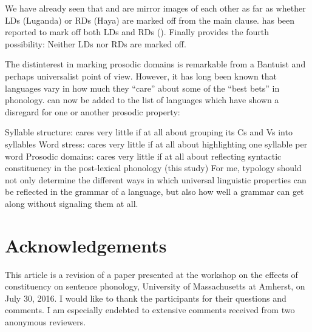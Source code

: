 \documentclass[output=paper]{langsci/langscibook}
\begin{document}
We have already seen that  and  are mirror images of each other as
far as whether \glspl{LD} (Luganda) or \glspl{RD} (Haya) are marked off from
the main clause.   has been reported to mark off both \glspl{LD} and
RDs (\citealt[1966--1967]{DowningMtenje2011}). Finally  provides the fourth
possibility: Neither \glspl{LD} nor \glspl{RD} are marked off.

The  distinterest in marking prosodic domains is
remarkable from a Bantuist and perhaps universalist point of view. However, it
has long been known that languages vary in how much they “care” about some of
the “best bets” in phonology.  can now be added to the list of languages
which have shown a disregard for one or another prosodic property:

\ea\label{ex:13.47}
    \ea Syllable structure:  cares very little if at all about grouping its Cs and Vs into syllables \citep{Hyman2011}
    \ex Word stress:  cares very little if at all about highlighting one syllable per word \citep[132]{Newman1947}
    \ex Prosodic domains:   cares very little if at all about reflecting syntactic constituency in the post-lexical phonology (this study)
    \z
\z
For me, typology should not only determine the different ways in which
universal linguistic properties can be reflected in the grammar of a language,
but also how well a grammar can get along without signaling them at all.



\printchapterglossary{}

\section*{Acknowledgements}

This article is a revision of a paper presented at the workshop on the effects
of constituency on sentence phonology, University of Massachusetts at Amherst, on
July 30, 2016. I would like to thank the participants for their questions and
comments. I am especially endebted to extensive comments received from two
anonymous reviewers.

{\sloppy\printbibliography[heading=subbibliography,notkeyword=this]}
\end{document}
